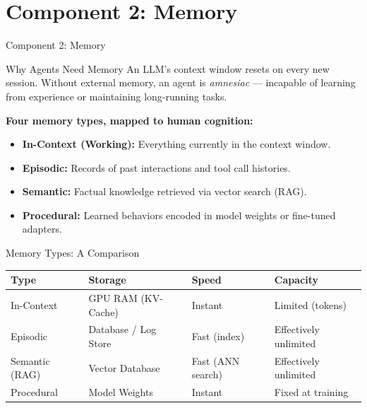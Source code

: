 \documentclass{beamer}       %
\begin{document}
\section{Component 2: Memory}

\begin{frame}{Component 2: Memory}
    \begin{block}{Why Agents Need Memory}
        An LLM's context window resets on every new session. Without external memory, an agent is \emph{amnesiac} --- incapable of learning from experience or maintaining long-running tasks.
    \end{block}
    \vspace{0.2cm}
    \textbf{Four memory types, mapped to human cognition:}
    \begin{itemize}
        \item \textbf{In-Context (Working):} Everything currently in the context window.
        \item \textbf{Episodic:} Records of past interactions and tool call histories.
        \item \textbf{Semantic:} Factual knowledge retrieved via vector search (RAG).
        \item \textbf{Procedural:} Learned behaviors encoded in model weights or fine-tuned adapters.
    \end{itemize}
\end{frame}

\begin{frame}{Memory Types: A Comparison}
    \small
    \begin{table}[]
        \centering
        \begin{tabular}{@{}llll@{}}
            \toprule
            \textbf{Type}      & \textbf{Storage}         & \textbf{Speed}   & \textbf{Capacity} \\ \midrule
            In-Context          & GPU RAM (KV-Cache)       & Instant          & Limited (tokens)  \\
            Episodic            & Database / Log Store     & Fast (index)     & Effectively unlimited \\
            Semantic (RAG)      & Vector Database          & Fast (ANN search)& Effectively unlimited \\
            Procedural          & Model Weights            & Instant          & Fixed at training \\
            \bottomrule
        \end{tabular}
    \end{table}
\end{frame}
\end{document}
